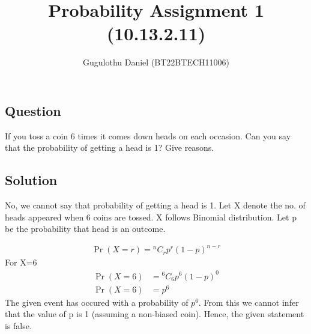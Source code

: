 \documentclass[12pt,twocolumn,notitlepage]{article}
\title{Probability Assignment 1 (10.13.2.11)}
\author{Gugulothu Daniel (BT22BTECH11006)}
\date{}
\newcommand*{\comb}[2]{{}^{#1}C_{#2}}
\begin{document}
	
	\maketitle
	\subsection*{Question}
   If you toss a coin 6 times it comes down heads on each occasion. Can you say that the probability of getting a head is 1? Give reasons.
	
	
	\subsection*{Solution}
	
	No, we cannot say that probability of getting a head is 1.
	Let X denote the no. of heads appeared when 6 coins are tossed. X follows Binomial distribution.
	Let p be the probability that head is an outcome.
	
	
	\begin{align}
		\Pr(X=r) = \comb{n}{r}p^r (1-p)^{n-r}
	\end{align}
For X=6
	\begin{align}
		\Pr(X=6) &= \comb{6}{6}p^6 (1-p)^{0} \\
		\Pr(X=6) &= p^6
	\end{align}
The given event has occured with a probability of $p^{6}$. From this we cannot infer that the value of p is 1 (assuming a non-biased coin). 
Hence, the given statement is false.
\end{document}
